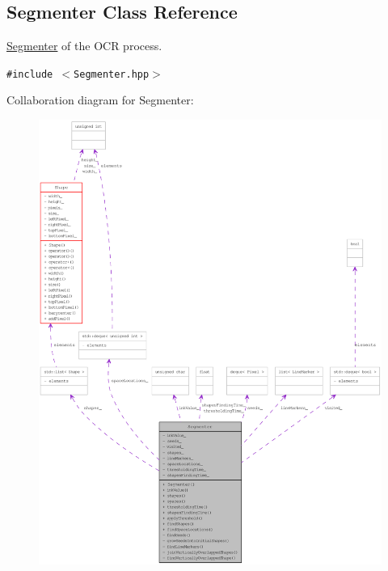 \hypertarget{class_segmenter}{
\subsection{Segmenter Class Reference}
\label{class_segmenter}
}
\hyperlink{class_segmenter}{Segmenter} of the OCR process.  


{\tt \#include $<$Segmenter.hpp$>$}

Collaboration diagram for Segmenter:\nopagebreak
\begin{figure}[H]
\begin{center}
\leavevmode
\includegraphics[width=400pt]{class_segmenter__coll__graph}
\end{center}
\end{figure}
